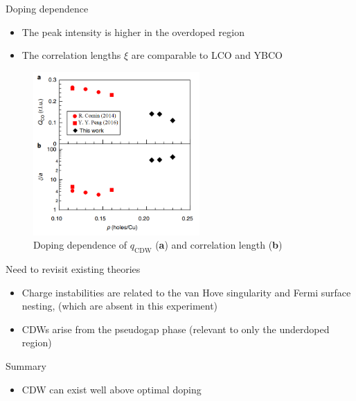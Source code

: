 \documentclass{beamer}
\begin{document}
\begin{frame}{Doping dependence}
\begin{itemize}
\item The peak intensity is higher in the overdoped region
\item The correlation lengths $\xi$ are comparable to LCO and YBCO
\end{itemize}
\begin{figure}
\includegraphics[width=2.5in]{figs/2018_4.png}
\caption*{Doping dependence of $q_\text{CDW}$ (\textbf{a}) and correlation length (\textbf{b})}
\end{figure}
\end{frame}


\begin{frame}{Need to revisit existing theories}
\begin{itemize}
\item Charge instabilities are related to the van Hove singularity and Fermi surface nesting, (which are absent in this experiment)
\item CDWs arise from the pseudogap phase (relevant to only the underdoped region)
\end{itemize}
\end{frame}

\begin{frame}{Summary}
\begin{itemize}
\item CDW can exist well above optimal doping
\end{itemize}
\end{frame}

\end{document}
